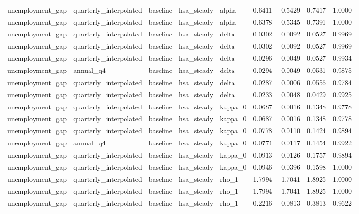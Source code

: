 \begin{tabular}{lllllrrrr}
unemployment\_gap & quarterly\_interpolated & baseline & hsa\_steady & alpha & 0.6411 & 0.5429 & 0.7417 & 1.0000 \\
unemployment\_gap & quarterly\_interpolated & baseline & hsa\_steady & alpha & 0.6378 & 0.5345 & 0.7391 & 1.0000 \\
unemployment\_gap & quarterly\_interpolated & baseline & hsa\_steady & delta & 0.0302 & 0.0092 & 0.0527 & 0.9969 \\
unemployment\_gap & quarterly\_interpolated & baseline & hsa\_steady & delta & 0.0302 & 0.0092 & 0.0527 & 0.9969 \\
unemployment\_gap & quarterly\_interpolated & baseline & hsa\_steady & delta & 0.0296 & 0.0049 & 0.0527 & 0.9934 \\
unemployment\_gap & annual\_q4 & baseline & hsa\_steady & delta & 0.0294 & 0.0049 & 0.0531 & 0.9875 \\
unemployment\_gap & quarterly\_interpolated & baseline & hsa\_steady & delta & 0.0287 & 0.0006 & 0.0556 & 0.9784 \\
unemployment\_gap & quarterly\_interpolated & baseline & hsa\_steady & delta & 0.0233 & 0.0048 & 0.0429 & 0.9925 \\
unemployment\_gap & quarterly\_interpolated & baseline & hsa\_steady & kappa\_0 & 0.0687 & 0.0016 & 0.1348 & 0.9778 \\
unemployment\_gap & quarterly\_interpolated & baseline & hsa\_steady & kappa\_0 & 0.0687 & 0.0016 & 0.1348 & 0.9778 \\
unemployment\_gap & quarterly\_interpolated & baseline & hsa\_steady & kappa\_0 & 0.0778 & 0.0110 & 0.1424 & 0.9894 \\
unemployment\_gap & annual\_q4 & baseline & hsa\_steady & kappa\_0 & 0.0774 & 0.0117 & 0.1454 & 0.9922 \\
unemployment\_gap & quarterly\_interpolated & baseline & hsa\_steady & kappa\_0 & 0.0913 & 0.0126 & 0.1757 & 0.9894 \\
unemployment\_gap & quarterly\_interpolated & baseline & hsa\_steady & kappa\_0 & 0.0946 & 0.0396 & 0.1598 & 1.0000 \\
unemployment\_gap & quarterly\_interpolated & baseline & hsa\_steady & rho\_1 & 1.7994 & 1.7041 & 1.8925 & 1.0000 \\
unemployment\_gap & quarterly\_interpolated & baseline & hsa\_steady & rho\_1 & 1.7994 & 1.7041 & 1.8925 & 1.0000 \\
unemployment\_gap & quarterly\_interpolated & baseline & hsa\_steady & rho\_1 & 0.2216 & -0.0813 & 0.3813 & 0.9622 \\

\end{tabular}
